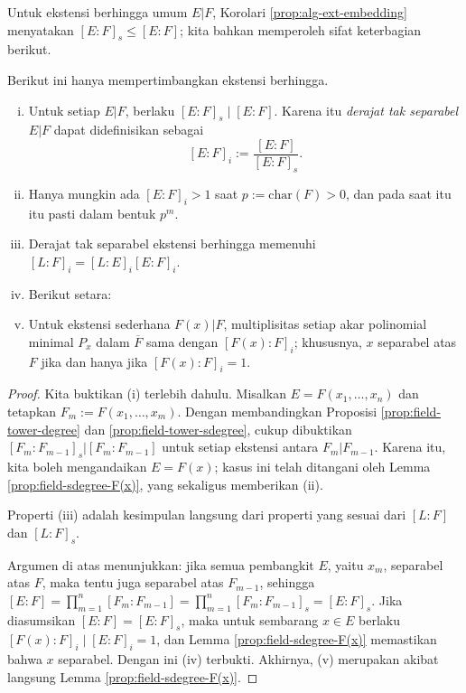 Untuk ekstensi berhingga umum $E|F$, Korolari \ref{prop:alg-ext-embedding} menyatakan $[E:F]_s \leq [E:F]$; kita bahkan memperoleh sifat keterbagian berikut.
\begin{definition-theorem}\label{def:insep-deg}
	Berikut ini hanya mempertimbangkan ekstensi berhingga.
	\begin{enumerate}[(i)]
		\item Untuk setiap $E|F$, berlaku $[E:F]_s \mid [E:F]$. Karena itu \emph{derajat tak separabel} $E|F$ dapat didefinisikan sebagai 
			\[ [E:F]_i := \frac{[E:F]}{[E:F]_s}. \]
		\item Hanya mungkin ada $[E:F]_i > 1$ saat $p := \text{char}(F) > 0$, dan pada saat itu itu pasti dalam bentuk $p^m$.
		\item Derajat tak separabel ekstensi berhingga memenuhi $[L:F]_i = [L:E]_i [E:F]_i$.
		\item Berikut setara:
		\item Untuk ekstensi sederhana $F(x)|F$, multiplisitas setiap akar polinomial minimal $P_x$ dalam $\overline{F}$ sama dengan $[F(x):F]_i$; khususnya, $x$ separabel atas $F$ jika dan hanya jika $[F(x):F]_i = 1$.
	\end{enumerate}
\end{definition-theorem}
\begin{proof}
	Kita buktikan (i) terlebih dahulu. Misalkan $E = F(x_1, \ldots, x_n)$ dan tetapkan $F_m := F(x_1, \ldots, x_m)$. Dengan membandingkan Proposisi \ref{prop:field-tower-degree} dan \ref{prop:field-tower-sdegree}, cukup dibuktikan $[F_m:F_{m-1}]_s | [F_m:F_{m-1}]$ untuk setiap ekstensi antara $F_m|F_{m-1}$. Karena itu, kita boleh mengandaikan $E = F(x)$; kasus ini telah ditangani oleh Lemma \ref{prop:field-sdegree-F(x)}, yang sekaligus memberikan (ii).
	
	Properti (iii) adalah kesimpulan langsung dari properti yang sesuai dari $[L:F]$ dan $[L:F]_s$.

	Argumen di atas menunjukkan: jika semua pembangkit $E$, yaitu $x_m$, separabel atas $F$, maka tentu juga separabel atas $F_{m-1}$, sehingga $[E:F] = \prod_{m=1}^n [F_m : F_{m-1}] = \prod_{m=1}^n [F_m : F_{m-1}]_s = [E:F]_s$. Jika diasumsikan $[E:F]=[E:F]_s$, maka untuk sembarang $x \in E$ berlaku $[F(x):F]_i \mid [E:F]_i = 1$, dan Lemma \ref{prop:field-sdegree-F(x)} memastikan bahwa $x$ separabel. Dengan ini (iv) terbukti. Akhirnya, (v) merupakan akibat langsung Lemma \ref{prop:field-sdegree-F(x)}.
\end{proof}

